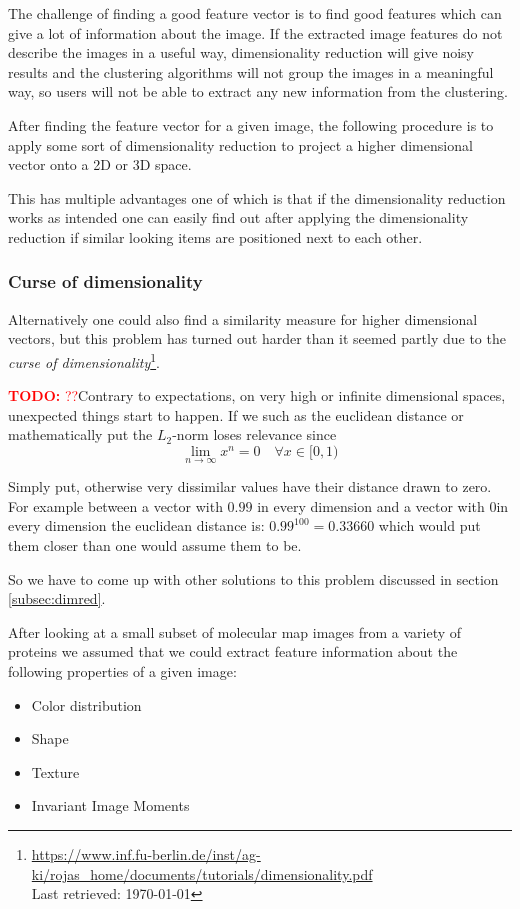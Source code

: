 \documentclass[journal]{vgtc}       %
\newcommand{\todo}[1]{\textcolor{red}{\textbf{TODO:} #1}}
\begin{document}
The challenge of finding a good feature vector is to find good features which can give a lot of information about the image.
If the extracted image features do not describe the images in a useful way, dimensionality reduction will give noisy results and the clustering algorithms will not group the images in a meaningful way, so users will not be able to extract any new information from the clustering.

After finding the feature vector for a given image, the following procedure is to apply some sort of dimensionality reduction to project a higher dimensional vector onto a 2D or 3D space.

This has multiple advantages one of which is that if the dimensionality reduction works as intended one can easily find out after applying the dimensionality reduction if similar looking items are positioned next to each other.

\subsubsection{Curse of dimensionality}
Alternatively one could also find a similarity measure for higher dimensional vectors, but this problem has turned out harder than it seemed partly due to the \textit{curse of dimensionality}\footnote{\url{https://www.inf.fu-berlin.de/inst/ag-ki/rojas_home/documents/tutorials/dimensionality.pdf}\\ Last retrieved: \today}.


\todo{??}Contrary to expectations, on very high or infinite dimensional spaces, unexpected things start to happen. If we  such as the euclidean distance or mathematically put the \(L_2\)-norm loses relevance since
\begin{equation}
\lim_{n\rightarrow \infty} x^n = 0 \quad \forall x \in [0,1)
\end{equation}

Simply put, otherwise very dissimilar values have their distance drawn to zero. For example between a vector with \(0.99\) in every dimension and a vector with \(0\)in every dimension the euclidean distance is: \(0.99^{100} = 0.33660\) which would put them closer than one would assume them to be.

So we have to come up with other solutions to this problem discussed in section \ref{subsec:dimred}. %

After looking at a small subset of molecular map images from a variety of proteins we assumed that we could  extract feature information about the following properties of a given image: 
\begin{itemize}
  \item Color distribution
  \item Shape
  \item Texture
  \item Invariant  Image Moments 
\end{itemize}
\end{document}
